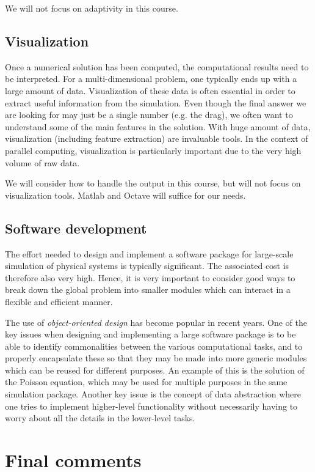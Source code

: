 We will not focus on adaptivity in this course.

\subsection{Visualization}

Once a numerical solution has been computed, the computational results need to
be interpreted. For a multi-dimensional problem, one typically ends up with a
large amount of data. Visualization of these data is often essential in order to
extract useful information from the simulation. Even though the final answer we
are looking for may just be a single number (e.g. the drag), we often want to
understand some of the main features in the solution. With huge amount of data,
visualization (including feature extraction) are invaluable tools. In the
context of parallel computing, visualization is particularly important due to
the very high volume of raw data.

We will consider how to handle the output in this course, but will not focus on
visualization tools. Matlab and Octave will suffice for our needs.

\subsection{Software development}

The effort needed to design and implement a software package for large-scale
simulation of physical systems is typically significant. The associated cost is
therefore also very high. Hence, it is very important to consider good ways to
break down the global problem into smaller modules which can interact in a
flexible and efficient manner.

The use of \emph{object-oriented design} has become popular in recent years. One
of the key issues when designing and implementing a large software package is to
be able to identify commonalities between the various computational tasks, and
to properly encapsulate these so that they may be made into more generic modules
which can be reused for different purposes. An example of this is the solution
of the Poisson equation, which may be used for multiple purposes in the same
simulation package. Another key issue is the concept of data abstraction where
one tries to implement higher-level functionality without necessarily having to
worry about all the details in the lower-level tasks.

\section{Final comments}

